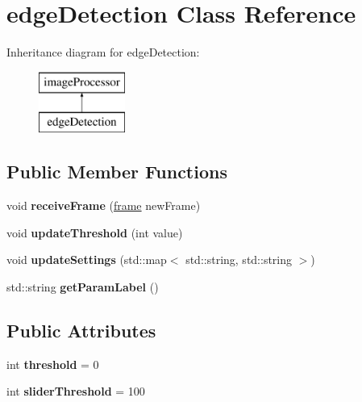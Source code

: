 \hypertarget{classedge_detection}{}\section{edge\+Detection Class Reference}
\label{classedge_detection}
Inheritance diagram for edge\+Detection\+:\begin{figure}[H]
\begin{center}
\leavevmode
\includegraphics[height=2.000000cm]{classedge_detection}
\end{center}
\end{figure}
\subsection*{Public Member Functions}
\begin{DoxyCompactItemize}
\item 
void {\bfseries receive\+Frame} (\hyperlink{classframe}{frame} new\+Frame)\hypertarget{classedge_detection_a67bf1c232cd856b735fe5d786cbe30e7}{}\label{classedge_detection_a67bf1c232cd856b735fe5d786cbe30e7}

\item 
void {\bfseries update\+Threshold} (int value)\hypertarget{classedge_detection_a4902490150a6371e8ed2c0e99e0e64f5}{}\label{classedge_detection_a4902490150a6371e8ed2c0e99e0e64f5}

\item 
void {\bfseries update\+Settings} (std\+::map$<$ std\+::string, std\+::string $>$)\hypertarget{classedge_detection_ad4b2e5b1a4aa3a29c5255f8ab66885d8}{}\label{classedge_detection_ad4b2e5b1a4aa3a29c5255f8ab66885d8}

\item 
std\+::string {\bfseries get\+Param\+Label} ()\hypertarget{classedge_detection_af479eae661c2bd12f3bee621a97e15b9}{}\label{classedge_detection_af479eae661c2bd12f3bee621a97e15b9}

\end{DoxyCompactItemize}
\subsection*{Public Attributes}
\begin{DoxyCompactItemize}
\item 
int {\bfseries threshold} = 0\hypertarget{classedge_detection_a8e46350aaef5e84ac13d95ec935212a9}{}\label{classedge_detection_a8e46350aaef5e84ac13d95ec935212a9}

\item 
int {\bfseries slider\+Threshold} = 100\hypertarget{classedge_detection_a49a4d56a565ef4ba732b19814b8ba7ec}{}\label{classedge_detection_a49a4d56a565ef4ba732b19814b8ba7ec}

\end{DoxyCompactItemize}
